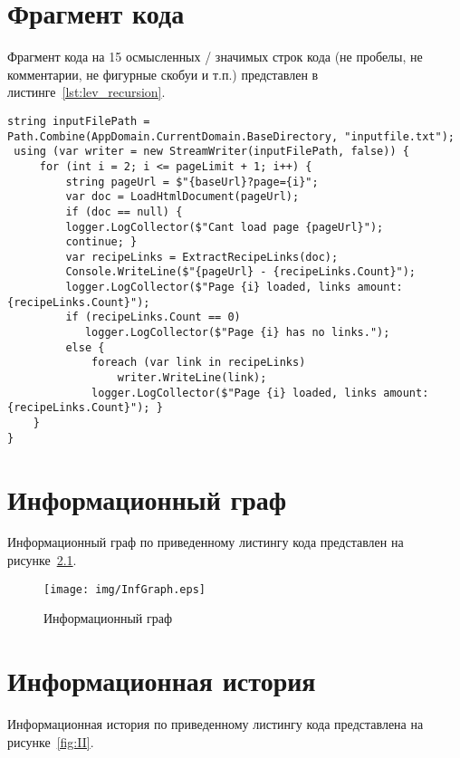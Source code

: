 \chapter{Фрагмент кода}

Фрагмент кода на 15 осмысленных / значимых строк кода (не пробелы, не комментарии, не фигурные скобуи и т.п.) представлен в листинге~\ref{lst:lev_recursion}.

\begin{center}
\captionsetup{justification=raggedright,singlelinecheck=off}
\begin{lstlisting}[label=lst:lev_recursion,caption=Фрагмент кода]
 string inputFilePath = Path.Combine(AppDomain.CurrentDomain.BaseDirectory, "inputfile.txt");
 using (var writer = new StreamWriter(inputFilePath, false)) {
     for (int i = 2; i <= pageLimit + 1; i++) {
         string pageUrl = $"{baseUrl}?page={i}";
         var doc = LoadHtmlDocument(pageUrl);
         if (doc == null) {
         logger.LogCollector($"Cant load page {pageUrl}");
         continue; }
         var recipeLinks = ExtractRecipeLinks(doc);
         Console.WriteLine($"{pageUrl} - {recipeLinks.Count}");
         logger.LogCollector($"Page {i} loaded, links amount: {recipeLinks.Count}");
         if (recipeLinks.Count == 0)
            logger.LogCollector($"Page {i} has no links.");
         else {
             foreach (var link in recipeLinks)
                 writer.WriteLine(link);
             logger.LogCollector($"Page {i} loaded, links amount: {recipeLinks.Count}"); }
    }
}
\end{lstlisting}
\end{center}

\chapter{Информационный граф}

Информационный граф по приведенному листингу кода представлен на рисунке~\ref{fig:IG}.

\begin{figure}[h!]
	\centering
	\texttt{[image: img/InfGraph.eps]}
	\caption{Информационный граф}
	\label{fig:IG}
\end{figure}


\chapter{Информационная история}

Информационная история по приведенному листингу кода представлена на рисунке~\ref{fig:II}.

